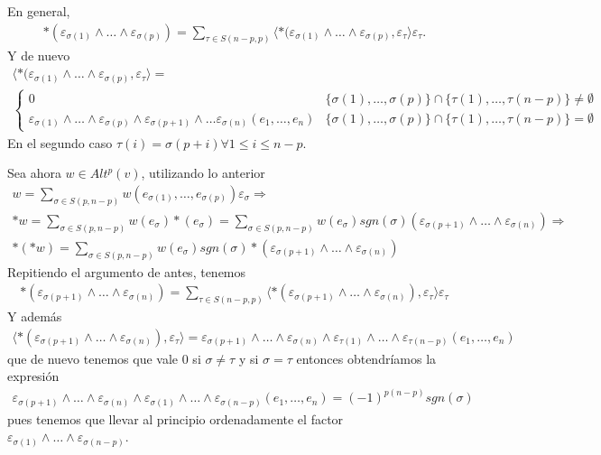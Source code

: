 \documentclass[twoside]{article}
\begin{document}
\begin{solucion}
En general, 
\begin{gather*}
*(\varepsilon_{\sigma(1)}\land\dots\land\varepsilon_{\sigma(p)})=\sum_{\tau\in S(n-p,p)}\langle *(\varepsilon_{\sigma(1)}\land\dots\land\varepsilon_{\sigma(p)},\varepsilon_{\tau}\rangle\varepsilon_{\tau}.
\end{gather*}
Y de nuevo
\begin{gather*}
\langle *(\varepsilon_{\sigma(1)}\land\dots\land\varepsilon_{\sigma(p)},\varepsilon_{\tau}\rangle=\\
\begin{cases}
0 & \{\sigma(1),\dots, \sigma(p)\}\cap\{\tau(1),\dots,\tau(n-p)\}\neq\emptyset\\
\varepsilon_{\sigma(1)}\land\dots\land\varepsilon_{\sigma(p)}\land\varepsilon_{\sigma(p+1)}\land\dots\varepsilon_{\sigma(n)}(e_1,\dots, e_n) & \{\sigma(1),\dots, \sigma(p)\}\cap\{\tau(1),\dots,\tau(n-p)\}=\emptyset
\end{cases}
\end{gather*}
En el segundo caso $\tau(i)=\sigma(p+i)\forall 1\leq i\leq n-p$.

Sea ahora $w\in Alt^p(v)$, utilizando lo anterior
\begin{gather*}
w=\sum_{\sigma\in S(p,n-p)}w(e_{\sigma(1)},\dots, e_{\sigma(p)})\varepsilon_{\sigma}\Rightarrow\\
*w=\sum_{\sigma\in S(p,n-p)}w(e_{\sigma})*(e_{\sigma})=\sum_{\sigma\in S(p,n-p)}w(e_{\sigma})sgn(\sigma)(\varepsilon_{\sigma(p+1)}\land\dots\land\varepsilon_{\sigma(n)})\Rightarrow\\
*(*w)=\sum_{\sigma\in S(p,n-p)}w(e_{\sigma})sgn(\sigma)*(\varepsilon_{\sigma(p+1)}\land\dots\land\varepsilon_{\sigma(n)})
\end{gather*}
Repitiendo el argumento de antes, tenemos
\begin{gather*}
*(\varepsilon_{\sigma(p+1)}\land\dots\land\varepsilon_{\sigma(n)})=\sum_{\tau\in S(n-p,p)}\langle *(\varepsilon_{\sigma(p+1)}\land\dots\land\varepsilon_{\sigma(n)}),\varepsilon_{\tau}\rangle\varepsilon_{\tau}
\end{gather*}
Y además
\begin{gather*}
\langle *(\varepsilon_{\sigma(p+1)}\land\dots\land\varepsilon_{\sigma(n)}),\varepsilon_{\tau}\rangle=\varepsilon_{\sigma(p+1)}\land\dots\land\varepsilon_{\sigma(n)}\land\varepsilon_{\tau(1)}\land\dots\land\varepsilon_{\tau(n-p)}(e_1,\dots, e_n)
\end{gather*}
que de nuevo tenemos que vale 0 si $\sigma\neq\tau$ y si $\sigma=\tau$ entonces obtendríamos la expresión
\begin{gather*}
\varepsilon_{\sigma(p+1)}\land\dots\land\varepsilon_{\sigma(n)}\land\varepsilon_{\sigma(1)}\land\dots\land\varepsilon_{\sigma(n-p)}(e_1,\dots, e_n)=(-1)^{p(n-p)}sgn(\sigma)
\end{gather*}
pues tenemos que llevar al principio ordenadamente el factor $\varepsilon_{\sigma(1)}\land\dots\land\varepsilon_{\sigma(n-p)}$.


\end{solucion}
\end{document}
